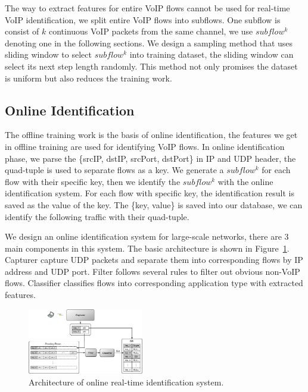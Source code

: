 \documentclass[conference]{IEEEtran}
\begin{document}
The way to extract features for entire VoIP flows cannot be used for real-time VoIP identification, we split entire VoIP flows into subflows. One subflow is consist of $k$ continuous VoIP packets from the same channel, we use $subflow^k$ denoting one in the following sections. We design a sampling method that uses sliding window to select $subflow^k$ into training dataset, the sliding window can select its next step length randomly. This method not only promises the dataset is uniform but also reduces the training work. 



\subsection{Online Identification}
\label{sec:onlineidentification}
The offline training work is the basis of online identification, the features we get in offline training are used for identifying VoIP flows. In online identification phase, we parse the \{srcIP, dstIP, srcPort, dstPort\} in IP and UDP header, the quad-tuple is used to separate flows as a key. We generate a $subflow^k$ for each flow with their specific key, then we identify the $subflow^k$ with the online identification system. For each flow with specific key, the identification result is saved as the value of the key. The \{key, value\} is saved into our database, we can identify the following traffic with their quad-tuple.

We design an online identification system for large-scale networks, there are 3 main components in this system. The basic architecture is shown in Figure~\ref{fig:online_architecture_new}. Capturer capture UDP packets and separate them into corresponding flows by IP address and UDP port. Filter follows several rules to filter out obvious non-VoIP flows. Classifier classifies flows into corresponding application type with extracted features. 
\begin{figure}[htp]
\begin{center}
\includegraphics[width=0.45\textwidth]{online_architecture_new.eps}
\caption{Architecture of online real-time identification system.}\label{fig:online_architecture_new}
\end{center}
\end{figure}
\end{document}
